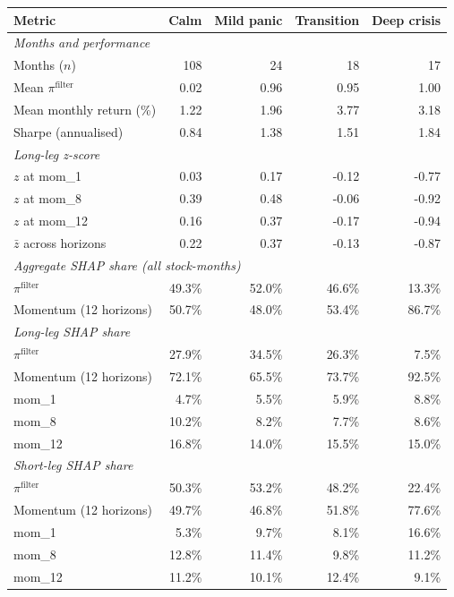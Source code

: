 \begin{table}[H]
\centering
\small
\begin{tabular}{l rrrr}
\toprule
Metric & Calm & Mild panic & Transition & Deep crisis \\
\midrule
\multicolumn{5}{l}{\emph{Months and performance}} \\
Months ($n$) & 108 & 24 & 18 & 17 \\
Mean $\pi^{\text{filter}}$ & 0.02 & 0.96 & 0.95 & 1.00 \\
Mean monthly return (\%) & 1.22 & 1.96 & 3.77 & 3.18 \\
Sharpe (annualised) & 0.84 & 1.38 & 1.51 & 1.84 \\
\midrule
\multicolumn{5}{l}{\emph{Long-leg z-score}} \\
$z$ at mom\_1 & 0.03 & 0.17 & -0.12 & -0.77 \\
$z$ at mom\_8 & 0.39 & 0.48 & -0.06 & -0.92 \\
$z$ at mom\_12 & 0.16 & 0.37 & -0.17 & -0.94 \\
$\bar z$ across horizons & 0.22 & 0.37 & -0.13 & -0.87 \\
\midrule
\multicolumn{5}{l}{\emph{Aggregate SHAP share (all stock-months)}} \\
$\pi^{\text{filter}}$ & 49.3\% & 52.0\% & 46.6\% & 13.3\% \\
Momentum (12 horizons) & 50.7\% & 48.0\% & 53.4\% & 86.7\% \\
\midrule
\multicolumn{5}{l}{\emph{Long-leg SHAP share}} \\
$\pi^{\text{filter}}$ & 27.9\% & 34.5\% & 26.3\% & 7.5\% \\
Momentum (12 horizons) & 72.1\% & 65.5\% & 73.7\% & 92.5\% \\
\quad mom\_1 & 4.7\% & 5.5\% & 5.9\% & 8.8\% \\
\quad mom\_8 & 10.2\% & 8.2\% & 7.7\% & 8.6\% \\
\quad mom\_12 & 16.8\% & 14.0\% & 15.5\% & 15.0\% \\
\midrule
\multicolumn{5}{l}{\emph{Short-leg SHAP share}} \\
$\pi^{\text{filter}}$ & 50.3\% & 53.2\% & 48.2\% & 22.4\% \\
Momentum (12 horizons) & 49.7\% & 46.8\% & 51.8\% & 77.6\% \\
\quad mom\_1 & 5.3\% & 9.7\% & 8.1\% & 16.6\% \\
\quad mom\_8 & 12.8\% & 11.4\% & 9.8\% & 11.2\% \\
\quad mom\_12 & 11.2\% & 10.1\% & 12.4\% & 9.1\% \\

\end{tabular}
\end{table}
